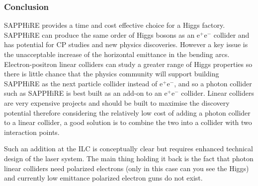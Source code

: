 \subsubsection{Conclusion}
SAPPHiRE provides a time and cost effective choice for a Higgs factory. SAPPHiRE can produce the same order of Higgs bosons as an e$^{+}$e$^{-}$ collider and has potential for CP studies and new physics discoveries. However a key issue is the unacceptable increase of the horizontal emittance in the bending arcs. Electron-positron linear colliders can study a greater range of Higgs properties so there is little chance that the physics community will support building SAPPHiRE as the next particle collider instead of e$^{+}$e$^{-}$, and so a photon collider such as SAPPHiRE is best built as an add-on to an e$^{+}$e$^{-}$  collider. Linear colliders are very expensive projects and should be built to maximise the discovery potential therefore considering the relatively low cost of adding a photon collider to a linear collider, a good solution is to combine the two into a collider with two interaction points.

Such an addition at the ILC is conceptually clear but requires enhanced technical design of the laser system. The main thing holding it back is the fact that photon linear colliders need polarized electrons (only in this case can you see the Higgs) and currently low emittance polarized electron guns do not exist.
